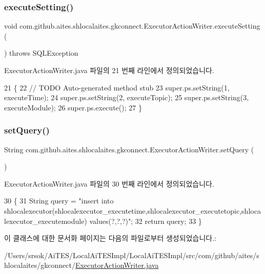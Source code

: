 \subsubsection{\texorpdfstring{execute\+Setting()}{executeSetting()}}
{\footnotesize\ttfamily void com.\+github.\+aites.\+shlocalaites.\+gkconnect.\+Executor\+Action\+Writer.\+execute\+Setting (\begin{DoxyParamCaption}{ }\end{DoxyParamCaption}) throws S\+Q\+L\+Exception}



Executor\+Action\+Writer.\+java 파일의 21 번째 라인에서 정의되었습니다.


\begin{DoxyCode}
21                                                      \{
22         \textcolor{comment}{// TODO Auto-generated method stub}
23         super.ps.setString(1, executeTime);
24         super.ps.setString(2, executeTopic);
25         super.ps.setString(3, executeModule);
26         super.ps.execute();
27     \}
\end{DoxyCode}
\mbox{\label{classcom_1_1github_1_1aites_1_1shlocalaites_1_1gkconnect_1_1_executor_action_writer_a239e1a51ec536a1e361acebba74af952}} 
\subsubsection{\texorpdfstring{set\+Query()}{setQuery()}}
{\footnotesize\ttfamily String com.\+github.\+aites.\+shlocalaites.\+gkconnect.\+Executor\+Action\+Writer.\+set\+Query (\begin{DoxyParamCaption}{ }\end{DoxyParamCaption})}



Executor\+Action\+Writer.\+java 파일의 30 번째 라인에서 정의되었습니다.


\begin{DoxyCode}
30                              \{
31         String query = \textcolor{stringliteral}{"insert into
       shlocalexecutor(shlocalexecutor\_executetime,shlocalexecutor\_executetopic,shlocalexecutor\_executemodule) values(?,?,?)"};
32         \textcolor{keywordflow}{return} query;
33     \}
\end{DoxyCode}


이 클래스에 대한 문서화 페이지는 다음의 파일로부터 생성되었습니다.\+:\begin{DoxyCompactItemize}
\item 
/\+Users/srsok/\+Ai\+T\+E\+S/\+Local\+Ai\+T\+E\+S\+Impl/\+Local\+Ai\+T\+E\+S\+Impl/src/com/github/aites/shlocalaites/gkconnect/\mbox{\hyperlink{_executor_action_writer_8java}{Executor\+Action\+Writer.\+java}}\end{DoxyCompactItemize}
